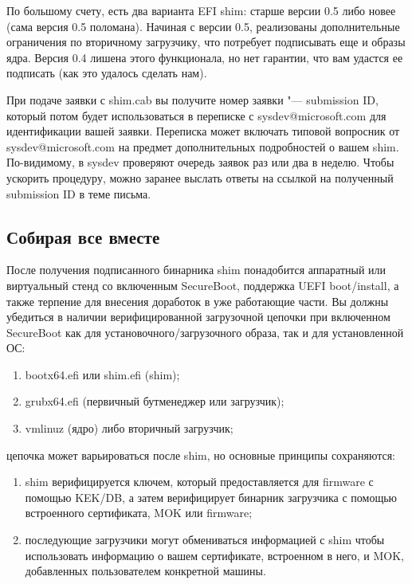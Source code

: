 \documentclass[10pt, a5paper]{article}
\begin{document}
По большому счету, есть два варианта EFI shim: старше версии 0.5 либо новее (сама версия 0.5 поломана). Начиная с версии 0.5, реализованы дополнительные ограничения по вторичному загрузчику, что потребует подписывать еще и образы ядра. Версия 0.4 лишена этого функционала, но нет гарантии, что вам удастся ее подписать (как это удалось сделать нам).

При подаче заявки с shim.cab вы получите номер заявки "--- sub\-mission ID, который потом будет использоваться в переписке с \linebreak sysdev@microsoft.com для идентификации вашей заявки. Переписка может включать типовой вопросник от sysdev@microsoft.com на предмет дополнительных подробностей о вашем shim. По-видимому, в sysdev проверяют очередь заявок раз или два в неделю. Чтобы ускорить процедуру, можно заранее выслать ответы на ссылкой на полученный submission ID в теме письма.

\subsection*{Собирая все вместе}

После получения подписанного бинарника shim понадобится аппаратный или виртуальный стенд со включенным SecureBoot, поддержка UEFI boot/install, а также терпение для внесения доработок в уже работающие части.
Вы должны убедиться в наличии верифицированной загрузочной цепочки при включенном SecureBoot как для установочного/загрузочного образа, так и для установленной ОС:

\begin{enumerate}
  \item bootx64.efi или shim.efi (shim);
  \item grubx64.efi (первичный бутменеджер или загрузчик);
  \item vmlinuz (ядро) либо вторичный загрузчик;
\end{enumerate}

цепочка может варьироваться после shim, но основные принципы сохраняются:

\begin{enumerate}
  \item shim верифицируется ключем, который предоставляется для firmware с помощью KEK/DB, а затем верифицирует бинарник загрузчика с помощью встроенного сертификата, MOK или firmware;
  \item последующие загрузчики могут обмениваться информацией с shim чтобы использовать информацию о вашем сертификате, встроенном в него, и MOK, добавленных пользователем конкретной машины.
\end{enumerate}
\end{document}
